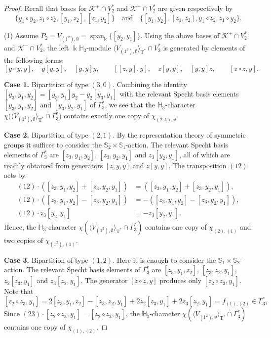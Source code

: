 \documentclass{amsart}
\theoremstyle{definition}
\theoremstyle{remark}
\numberwithin{equation}{section}
\newcommand{\lr}[1]{\langle #1 \rangle}
\def \Ga{\Gamma}
\def \k{\Bbbk}
\def \H{\mathbb{H}}
\def \S{\mathbb{S}}
\def \K{\mathcal{K}}
\def \sp{\operatorname{span}}
\def \T{\operatorname{T}}
\def \es{\emptyset}
\begin{document}
\begin{proof}
	Recall that bases for $\K^+ \cap V_2^*$ and $\K^- \cap V_2^*$ are given respectively by 
	\[
	\{y_1 \circ y_2, z_1 \circ z_2, [y_1,z_2], [z_1,y_2]\} \quad \text{and} \quad \{[y_1,y_2], [z_1,z_2], y_1 \circ z_2, z_1 \circ y_2\}.
	\]
	
	(1) Assume $P_2 = V_{(1^2), \es} = \sp_\k \{[y_2, y_1] \}$. Using the above bases of $\K^+ \cap V_2^*$ and $\K^- \cap V_2^*$, the left $\k\H_3$-module $\lr{V_{(1^2), \es}}_{\T^*} \cap V_3^*$ is generated by elements of the following forms:
	\[
	[y \circ y, y], \quad y[y,y], \quad [y,y]y, \qquad [[z,y],y], \quad z[y,y], \quad [y,y]z, \qquad [z \circ z, y].
	\]
	
	\textbf{Case 1.} Bipartition of type $(3,0)$. Combining the identity $[y_3,y_1,y_2]=[y_3,y_1]y_2-y_2[y_3,y_1]$ with the relevant Specht basis elements $[y_3,y_1,y_2]$ and $[y_3,y_2,y_1]$ of $\Ga_3^*$, we see that the $\H_3$-character $\chi\big(\lr{V_{(1^2), \es}}_{\T^*} \cap \Ga_3^*\big)$ contains exactly one copy of $\chi_{(2,1),\es}$.
	
	\textbf{Case 2.} Bipartition of type $(2,1)$. By the representation theory of symmetric groups it suffices to consider the $\S_2\times\S_1$-action. The relevant Specht basis elements of $\Ga_3^*$ are $[z_3,y_1,y_2]$, $[z_3,y_2,y_1]$ and $z_3[y_2,y_1]$, all of which are readily obtained from generators $[z,y,y]$ and $z[y,y]$. The transposition $(12)$ acts by
	\begin{align*}
		(12)\cdot([z_3,y_1,y_2]+[z_3,y_2,y_1])&=([z_3,y_1,y_2]+[z_3,y_2,y_1]),\\
		(12)\cdot([z_3,y_1,y_2]-[z_3,y_2,y_1])&=-([z_3,y_1,y_2]-[z_3,y_2,y_1]),\\
		(12)\cdot z_3[y_2,y_1]&=-z_3[y_2,y_1].
	\end{align*}
	Hence, the $\H_3$-character $\chi( \lr{V_{(1^2), \es}}_{\T^*} \cap \Ga_3^* )$ contains one copy of $\chi_{(2),(1)}$ and two copies of $\chi_{(1^2),(1)}$.	
	
	\textbf{Case 3.} Bipartition of type $(1,2)$. Here it is enough to consider the $\S_1\times\S_2$-action. The relevant Specht basis elements of $\Ga_3^*$ are $[z_3,y_1,z_2]$, $[z_3,z_2,y_1]$, $z_2[z_3,y_1]$ and $z_3[z_2,y_1]$. The generator $[z\circ z,y]$ produces only $[z_2\circ z_3,y_1]$. Note that
	\[
	[z_2 \circ z_3,y_1]=2[z_3,y_1,z_2]-[z_3,z_2,y_1]+2z_2[z_3,y_1]+2z_3[z_2,y_1] = f_{(1),(2)} \in \Ga_3^*,
	\]
	Since $(23)\cdot [z_2 \circ z_3,y_1] = [z_2 \circ z_3,y_1]$, the $\H_3$-character $\chi({\lr{V_{(1^2), \es}}_{\T^*} \cap \Ga_3^*})$ contains one copy of $\chi_{(1),(2)}$.
	

\end{proof}
\end{document}
